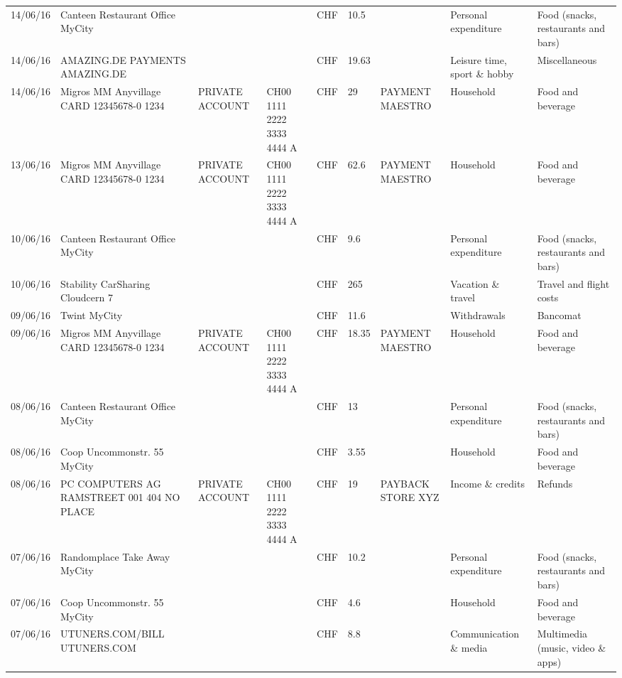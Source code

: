 \begin{landscape}
\begin{center}
\begin{longtable}{lllllllll}
		14/06/16 & Canteen Restaurant Office      MyCity &       &       & CHF   & 10.5  &       & Personal expenditure & Food (snacks, restaurants and bars) \\
		14/06/16 & AMAZING.DE PAYMENTS       AMAZING.DE &       &       & CHF   & 19.63 &       & Leisure time, sport \& hobby & Miscellaneous \\
		14/06/16 & Migros MM Anyvillage CARD 12345678-0 1234 & PRIVATE ACCOUNT & CH00 1111 2222 3333 4444 A & CHF   & 29    & PAYMENT MAESTRO & Household & Food and beverage \\
		13/06/16 & Migros MM Anyvillage CARD 12345678-0 1234 & PRIVATE ACCOUNT & CH00 1111 2222 3333 4444 A & CHF   & 62.6  & PAYMENT MAESTRO & Household & Food and beverage \\
		10/06/16 & Canteen Restaurant Office      MyCity &       &       & CHF   & 9.6   &       & Personal expenditure & Food (snacks, restaurants and bars) \\
		10/06/16 & Stability CarSharing      Cloudcern 7 &       &       & CHF   & 265   &       & Vacation \& travel & Travel and flight costs \\
		09/06/16 & Twint               MyCity &       &       & CHF   & 11.6  &       & Withdrawals & Bancomat \\
		09/06/16 & Migros MM Anyvillage CARD 12345678-0 1234 & PRIVATE ACCOUNT & CH00 1111 2222 3333 4444 A & CHF   & 18.35 & PAYMENT MAESTRO & Household & Food and beverage \\
		08/06/16 & Canteen Restaurant Office      MyCity &       &       & CHF   & 13    &       & Personal expenditure & Food (snacks, restaurants and bars) \\
		08/06/16 & Coop Uncommonstr. 55   MyCity &       &       & CHF   & 3.55  &       & Household & Food and beverage \\
		08/06/16 & PC COMPUTERS AG RAMSTREET 001 404 NO PLACE & PRIVATE ACCOUNT & CH00 1111 2222 3333 4444 A & CHF   & 19    & PAYBACK STORE XYZ & Income \& credits & Refunds \\
		07/06/16 & Randomplace Take Away     MyCity &       &       & CHF   & 10.2  &       & Personal expenditure & Food (snacks, restaurants and bars) \\
		07/06/16 & Coop Uncommonstr. 55   MyCity &       &       & CHF   & 4.6   &       & Household & Food and beverage \\
		07/06/16 & UTUNERS.COM/BILL          UTUNERS.COM &       &       & CHF   & 8.8   &       & Communication \& media & Multimedia (music, video \& apps) \\

\end{longtable}
\end{center}
\end{landscape}

